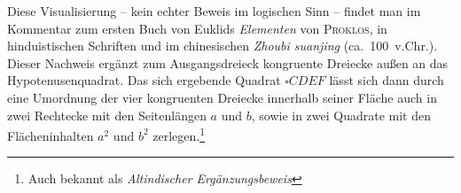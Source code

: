 \begin{bew}
  Die\-se Vi\-su\-a\-li\-sie\-rung -- kein echter Beweis im logischen Sinn -- findet man im Kommentar zum ersten Buch von Euklids \emph{Elementen} von \textsc{Proklos}, in hinduistischen Schriften und im chinesischen \emph{Zhoubi suanjing} (ca.~100~v.Chr.). Dieser Nachweis ergänzt zum Ausgangsdreieck kongruente Dreiecke außen an das Hypotenusenquadrat. Das sich ergebende Quadrat \(\square CDEF\) lässt sich dann durch eine Umordnung der vier kongruenten Dreiecke innerhalb seiner Fläche auch in zwei Rechtecke mit den Seitenlängen \(a\) und \(b\), sowie in zwei Quadrate mit den Flächeninhalten \(a^2\) und \(b^2\) zerlegen.\footnote{Auch bekannt als \emph{Altindischer Ergänzungsbeweis}}
 \begin{figure}\begin{center}
\end{center}
\end{figure}
\end{bew}
